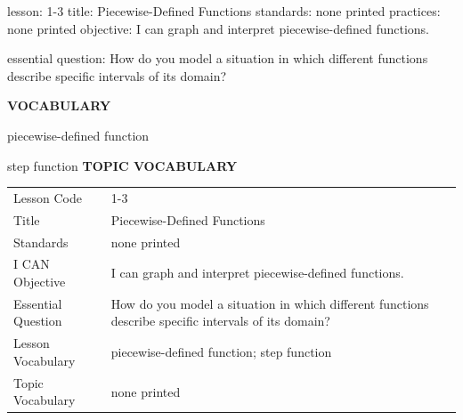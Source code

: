 \documentclass{article}
\newenvironment{lesson-meta}{}{}        %
\newcommand{\te}[1]{}                   %
\begin{document}
\begin{lesson-meta}
lesson: 1-3
title: Piecewise-Defined Functions
standards: none printed
practices: none printed
objective: I can graph and interpret piecewise-defined functions.

essential question: How do you model a situation in which different functions describe specific intervals of its domain?

\textbf{VOCABULARY}
\item piecewise-defined function
\item step function
\textbf{TOPIC VOCABULARY}
\te{No topic vocabulary list or numbered standards/practice codes are printed. I CAN statement and Essential Question are on PDF pages 39-40.}
\begin{tabular}{ll}
Lesson Code & 1-3 \\
Title & Piecewise-Defined Functions \\
Standards & none printed \\
I CAN Objective & I can graph and interpret piecewise-defined functions. \\
Essential Question & How do you model a situation in which different functions describe specific intervals of its domain? \\
Lesson Vocabulary & piecewise-defined function; step function \\
Topic Vocabulary & none printed \\
\end{tabular}
\end{lesson-meta}
\end{document}
